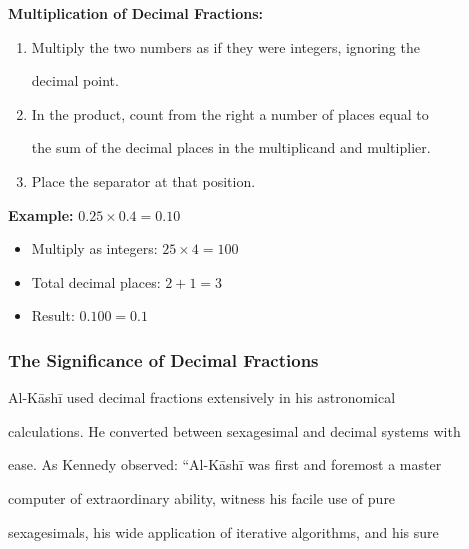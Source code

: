 \documentclass[11pt,a4paper]{article}
\newenvironment{mathalgo}{%

  \par\vspace{0.3cm}

  \begin{framed}

  \setlength{\parindent}{0pt}

}{%

  \end{framed}

  \par\vspace{0.3cm}

}
\begin{document}
\begin{mathalgo}

\textbf{Multiplication of Decimal Fractions:}

\begin{enumerate}[nosep]

  \item Multiply the two numbers as if they were integers, ignoring the

  decimal point.

  \item In the product, count from the right a number of places equal to

  the sum of the decimal places in the multiplicand and multiplier.

  \item Place the separator at that position.

\end{enumerate}



\textbf{Example:} $0.25 \times 0.4 = 0.10$

\begin{itemize}[nosep]

  \item Multiply as integers: $25 \times 4 = 100$

  \item Total decimal places: $2 + 1 = 3$

  \item Result: $0.100 = 0.1$

\end{itemize}

\end{mathalgo}



\subsubsection{The Significance of Decimal Fractions}



Al-K\=ash\=i used decimal fractions extensively in his astronomical

calculations. He converted between sexagesimal and decimal systems with

ease. As Kennedy observed: ``Al-K\=ash\=i was first and foremost a master

computer of extraordinary ability, witness his facile use of pure

sexagesimals, his wide application of iterative algorithms, and his sure
\end{document}
